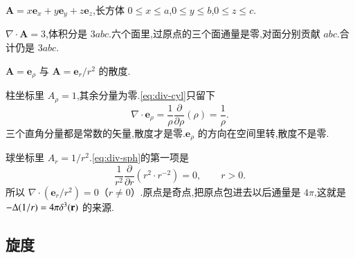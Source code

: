 \begin{example}
$\mathbf{A}=x\mathbf{e}_x+y\mathbf{e}_y+z\mathbf{e}_z$,长方体 $0\leq x\leq a$,$0\leq y\leq b$,$0\leq z\leq c$.
\end{example}
\begin{solution}
$\nabla\cdot\mathbf{A}=3$,体积分是 $3abc$.六个面里,过原点的三个面通量是零,对面分别贡献 $abc$.合计仍是 $3abc$.
\end{solution}

\begin{example}
$\mathbf{A}=\mathbf{e}_{\rho}$ 与 $\mathbf{A}=\mathbf{e}_r/r^2$ 的散度.
\end{example}
\begin{solution}
柱坐标里 $A_{\rho}=1$,其余分量为零.\eqref{eq:div-cyl}只留下
\begin{equation}
  \nabla\cdot\mathbf{e}_{\rho}=\frac{1}{\rho}\frac{\partial}{\partial\rho}(\rho)=\frac{1}{\rho}.
\end{equation}
三个直角分量都是常数的矢量,散度才是零.$\mathbf{e}_{\rho}$ 的方向在空间里转,散度不是零.

球坐标里 $A_r=1/r^2$.\eqref{eq:div-sph}的第一项是
\begin{equation}
  \frac{1}{r^2}\frac{\partial}{\partial r}(r^2\cdot r^{-2})=0,
  \qquad r>0.
\end{equation}
所以 $\nabla\cdot(\mathbf{e}_r/r^2)=0$（$r\neq 0$）.原点是奇点,把原点包进去以后通量是 $4\pi$,这就是 $-\Delta(1/r)=4\pi\delta^3({\mathbf{r}})$ 的来源.
\end{solution}

\subsection{旋度}

